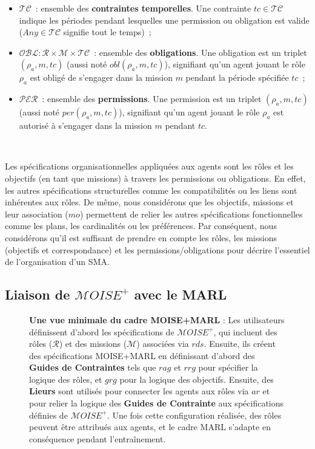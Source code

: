 \documentclass[francais,ROIA,Unicode,manuscript]{cedram}
\begin{document}
\begin{itemize}
    \item $\mathcal{TC}$~: ensemble des \textbf{contraintes temporelles}. Une contrainte $tc \in \mathcal{TC}$ indique les périodes pendant lesquelles une permission ou obligation est valide ($Any \in \mathcal{TC}$ signifie tout le temps)~;
    \item $\mathcal{OBL}: \mathcal{R} \times \mathcal{M} \times \mathcal{TC}$~: ensemble des \textbf{obligations}. Une obligation est un triplet $(\rho_a, m, tc)$ (aussi noté $obl(\rho_a, m, tc)$), signifiant qu'un agent jouant le rôle $\rho_a$ est obligé de s'engager dans la mission $m$ pendant la période spécifiée $tc$~;
    \item $\mathcal{PER}$~: ensemble des \textbf{permissions}. Une permission est un triplet $(\rho_a, m, tc)$ (aussi noté $per(\rho_a, m, tc)$), signifiant qu'un agent jouant le rôle $\rho_a$ est autorisé à s'engager dans la mission $m$ pendant $tc$.
\end{itemize}

\

\noindent Les spécifications organisationnelles appliquées aux agents sont les rôles et les objectifs (en tant que missions) à travers les permissions ou obligations. En effet, les autres spécifications structurelles comme les compatibilités ou les liens sont inhérentes aux rôles. De même, nous considérons que les objectifs, missions et leur association ($mo$) permettent de relier les autres spécifications fonctionnelles comme les plans, les cardinalités ou les préférences.
Par conséquent, nous considérons qu'il est suffisant de prendre en compte les rôles, les missions (objectifs et correspondance) et les permissions/obligations pour décrire l'essentiel de l'organisation d'un SMA.


\subsection{Liaison de \(\mathcal{M}OISE^+\) avec le MARL}

\begin{figure}[h!]

    \caption{\textbf{Une vue minimale du cadre MOISE+MARL} :
        Les utilisateurs définissent d'abord les spécifications de \(\mathcal{M}OISE^+\), qui incluent des rôles (\(\mathcal{R}\)) et des missions (\(\mathcal{M}\)) associées via \(rds\). Ensuite, ils créent des spécifications MOISE+MARL en définissant d'abord des \textbf{Guides de Contraintes} tels que \(rag\) et \(rrg\) pour spécifier la logique des rôles, et \(grg\) pour la logique des objectifs.
        Ensuite, des \textbf{Lieurs} sont utilisés pour connecter les agents aux rôles via \(ar\) et pour relier la logique des \textbf{Guides de Contrainte} aux spécifications définies de \(\mathcal{M}OISE^+\). Une fois cette configuration réalisée, des rôles peuvent être attribués aux agents, et le cadre MARL s'adapte en conséquence pendant l'entraînement.
    }
    \label{fig:mm_synthesis}
\end{figure}
\end{document}
